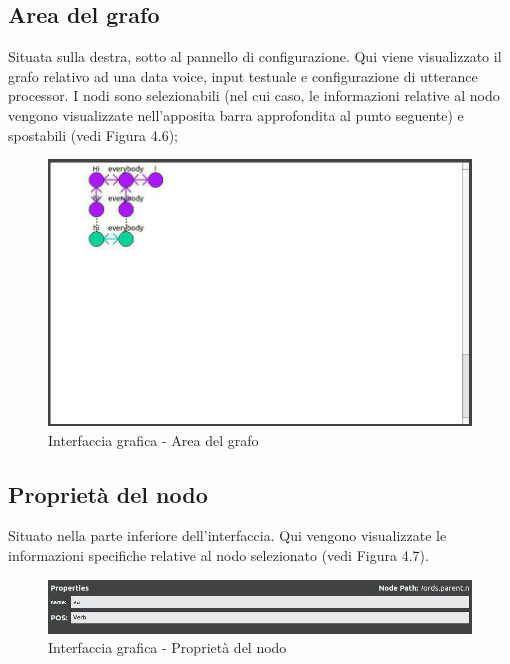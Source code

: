 \documentclass[openany,12pt,a4paper]{report}
\begin{document}
 	\subsection{Area del grafo}
 	Situata sulla destra, sotto al pannello di configurazione. Qui viene visualizzato il grafo relativo ad una data voice, input testuale e configurazione di utterance processor. I nodi sono selezionabili (nel cui caso, le informazioni relative al nodo vengono visualizzate nell'apposita barra approfondita al punto seguente) e spostabili (vedi Figura 4.6);
 		\begin{figure}[H]
 			
 			\centering
 			
 				\includegraphics[width=\textwidth]{./img/area_grafo}
 			
 			\caption{Interfaccia grafica - Area del grafo}
 			
 		\end{figure}
 	
 	\subsection{Proprietà del nodo}
 	Situato nella parte inferiore dell'interfaccia. Qui vengono visualizzate le informazioni specifiche relative al nodo selezionato (vedi Figura 4.7).
 		\begin{figure}[H]
 			
 			\centering
 			
 				\includegraphics[width=\textwidth]{./img/proprieta_nodo}
 			
 			\caption{Interfaccia grafica - Proprietà del nodo}
 			
 		\end{figure}
	
\end{document}
